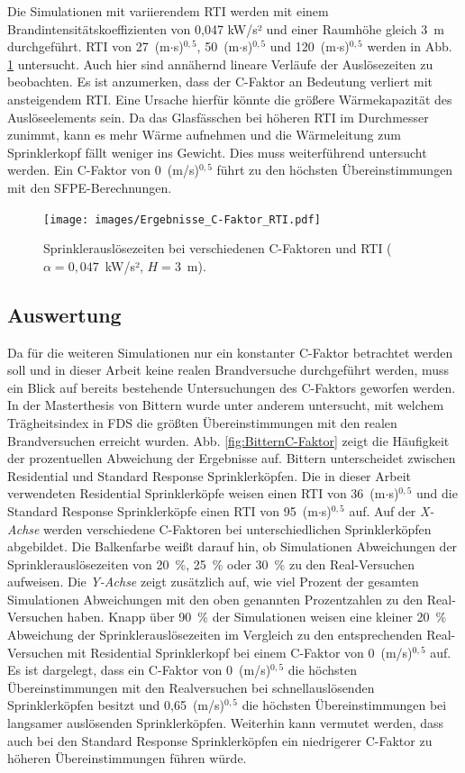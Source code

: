 Die Simulationen mit variierendem RTI werden mit einem Brandintensitätskoeffizienten von 0,047 kW/s² und einer Raumhöhe gleich 3~m durchgeführt. RTI von 27~(m$\cdot$s)$^{0,5}$, 50~(m$\cdot$s)$^{0,5}$ und 120~(m$\cdot$s)$^{0,5}$ werden in Abb. \ref{fig:Ergebnisse_C-Faktor_RTI} untersucht. Auch hier sind annähernd lineare Verläufe der Auslösezeiten zu beobachten. Es ist anzumerken, dass der C-Faktor an Bedeutung verliert mit ansteigendem RTI. Eine Ursache hierfür könnte die größere Wärmekapazität des Auslöseelements sein. Da das Glasfässchen bei höheren RTI im Durchmesser zunimmt, kann es mehr Wärme aufnehmen und die Wärmeleitung zum Sprinklerkopf fällt weniger ins Gewicht. Dies muss weiterführend untersucht werden.
Ein C-Faktor von 0~(m/s)$^{0,5}$ führt zu den höchsten Übereinstimmungen mit den SFPE-Berechnungen. 
\begin{figure}
    \centering
    \texttt{[image: images/Ergebnisse\_C-Faktor\_RTI.pdf]}
    \caption{Sprinklerauslösezeiten bei verschiedenen C-Faktoren und RTI ($\alpha=0{,}047$~kW/s², $H=3$~m).}
    \label{fig:Ergebnisse_C-Faktor_RTI}
\end{figure}

\subsection{Auswertung}

Da für die weiteren Simulationen nur ein konstanter C-Faktor betrachtet werden soll und in dieser Arbeit keine realen Brandversuche durchgeführt werden, muss ein Blick auf bereits bestehende Untersuchungen des C-Faktors geworfen werden. In der Masterthesis von Bittern \cite{Bittern2004} wurde unter anderem untersucht, mit welchem Trägheitsindex in FDS die größten Übereinstimmungen mit den realen Brandversuchen erreicht wurden. Abb. \ref{fig:BitternC-Faktor} zeigt die Häufigkeit der prozentuellen Abweichung der Ergebnisse auf. Bittern unterscheidet zwischen Residential und Standard Response Sprinklerköpfen. Die in dieser Arbeit verwendeten Residential Sprinklerköpfe weisen einen RTI von 36~(m$\cdot$s)$^{0,5}$ und die Standard Response Sprinklerköpfe einen RTI von 95~(m$\cdot$s)$^{0,5}$ auf. 
Auf der \emph{X-Achse} werden verschiedene C-Faktoren bei unterschiedlichen Sprinklerköpfen abgebildet. Die Balkenfarbe weißt darauf hin, ob Simulationen Abweichungen der Sprinklerauslösezeiten von 20~\%, 25~\% oder 30~\% zu den Real-Versuchen aufweisen.
Die \emph{Y-Achse} zeigt zusätzlich auf, wie viel Prozent der gesamten Simulationen Abweichungen mit den oben genannten Prozentzahlen zu den Real-Versuchen haben. Knapp über 90~\% der Simulationen weisen eine kleiner 20~\% Abweichung der Sprinklerauslösezeiten im Vergleich zu den entsprechenden Real-Versuchen mit Residential Sprinklerkopf bei einem C-Faktor von 0~(m/s)$^{0,5}$ auf.
Es ist dargelegt, dass ein C-Faktor von 0~(m/s)$^{0,5}$ die höchsten Übereinstimmungen mit den Realversuchen bei schnellauslösenden Sprinklerköpfen besitzt und 0,65~(m/s)$^{0,5}$ die höchsten Übereinstimmungen bei langsamer auslösenden Sprinklerköpfen. Weiterhin kann vermutet werden, dass auch bei den Standard Response Sprinklerköpfen ein niedrigerer C-Faktor zu höheren Übereinstimmungen führen würde. 

